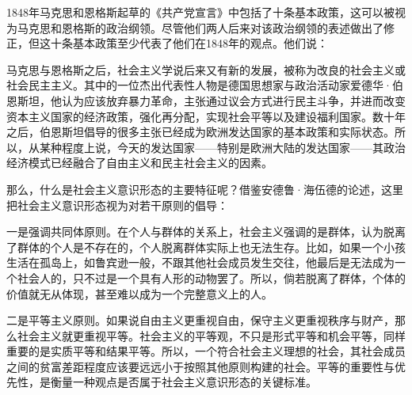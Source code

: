 1848年马克思和恩格斯起草的《共产党宣言》中包括了十条基本政策，这可以被视为马克思和恩格斯的政治纲领。尽管他们两人后来对该政治纲领的表述做出了修正，但这十条基本政策至少代表了他们在1848年的观点。他们说：


马克思与恩格斯之后，社会主义学说后来又有新的发展，被称为改良的社会主义或社会民主主义。其中的一位杰出代表性人物是德国思想家与政治活动家爱德华·伯恩斯坦，他认为应该放弃暴力革命，主张通过议会方式进行民主斗争，并进而改变资本主义国家的经济政策，强化再分配，实现社会平等以及建设福利国家。数十年之后，伯恩斯坦倡导的很多主张已经成为欧洲发达国家的基本政策和实际状态。所以，从某种程度上说，今天的发达国家——特别是欧洲大陆的发达国家——其政治经济模式已经融合了自由主义和民主社会主义的因素。

那么，什么是社会主义意识形态的主要特征呢？借鉴安德鲁·海伍德的论述，这里把社会主义意识形态视为对若干原则的倡导：

一是强调共同体原则。在个人与群体的关系上，社会主义强调的是群体，认为脱离了群体的个人是不存在的，个人脱离群体实际上也无法生存。比如，如果一个小孩生活在孤岛上，如鲁宾逊一般，不跟其他社会成员发生交往，他最后是无法成为一个社会人的，只不过是一个具有人形的动物罢了。所以，倘若脱离了群体，个体的价值就无从体现，甚至难以成为一个完整意义上的人。

二是平等主义原则。如果说自由主义更重视自由，保守主义更重视秩序与财产，那么社会主义就更重视平等。社会主义的平等观，不只是形式平等和机会平等，同样重要的是实质平等和结果平等。所以，一个符合社会主义理想的社会，其社会成员之间的贫富差距程度应该要远远小于按照其他原则构建的社会。平等的重要性与优先性，是衡量一种观点是否属于社会主义意识形态的关键标准。

